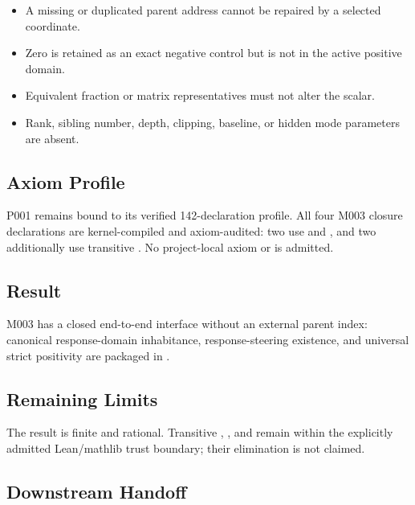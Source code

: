 \begin{itemize}
\tightlist
\item
  A missing or duplicated parent address cannot be repaired by a
  selected coordinate.
\item
  Zero is retained as an exact negative control but is not in the active
  positive domain.
\item
  Equivalent fraction or matrix representatives must not alter the
  scalar.
\item
  Rank, sibling number, depth, clipping, baseline, or hidden mode
  parameters are absent.
\end{itemize}

\subsection{Axiom Profile}\label{axiom-profile-8}

P001 remains bound to its verified 142-declaration profile. All four
M003 closure declarations are kernel-compiled and axiom-audited: two use
\texttt{\protect{}} and \texttt{\protect{}}, and two additionally use
transitive \texttt{\protect{}}. No project-local axiom or
\texttt{\protect{}} is admitted.

\subsection{Result}\label{result-23}

M003 has a closed end-to-end interface without an external parent index:
canonical response-domain inhabitance, response-steering existence, and
universal strict positivity are packaged in
\texttt{\protect{}}.

\subsection{Remaining Limits}\label{remaining-limits-8}

The result is finite and rational. Transitive \texttt{\protect{}},
\texttt{\protect{}}, and \texttt{\protect{}} remain within the
explicitly admitted Lean/mathlib trust boundary; their elimination is
not claimed.

\subsection{Downstream Handoff}\label{downstream-handoff-23}

